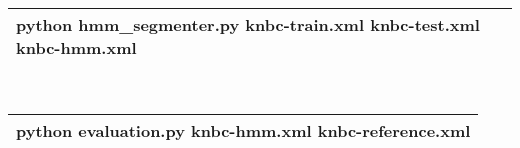 \documentclass[a4paper]{article}
\begin{document}
	 \\
	\begin{tabular}{|l|}
  		\hline
  		python hmm\_segmenter.py knbc-train.xml knbc-test.xml knbc-hmm.xml  \\
		\hline
	\end{tabular}
	\vspace{0.5cm}
	
	 \\
	\begin{tabular}{|l|}
  		\hline
  		python evaluation.py knbc-hmm.xml knbc-reference.xml  \\
  		\hline
	\end{tabular}
	
	\vspace{2cm}
	
	
	
	
\end{document}
